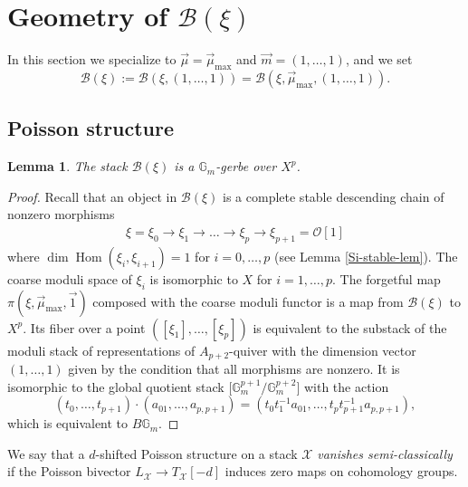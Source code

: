\documentclass[reqno]{amsart}
\newtheorem{lemma}[theorem]{Lemma}
\theoremstyle{definition}
\theoremstyle{remark}
\newcommand{\G}{{\mathbb G}}
\newcommand{\Hom}{\operatorname{Hom}}
\newcommand{\cO}{\mathcal{O}}
\newcommand{\sX}{\mathscr{X}}
\newcommand{\sB}{\mathscr{B}}
\newcommand{\am}{\overrightarrow{m}}
\newcommand{\aone}{\overrightarrow{1}}
\newcommand{\amu}{\overrightarrow{\mu}}
\numberwithin{equation}{section}
\begin{document}

\section{Geometry of $\sB(\xi)$}
\label{sec:m=1}

In this section we specialize to $\amu=\amu_{\max}$ and $\am=(1,\ldots,1)$, and we set
$$\sB(\xi):=\sB(\xi,(1,\ldots,1))=\sB(\xi,\amu_{\max},(1,\ldots,1)).$$

\subsection{Poisson structure}
\begin{lemma}\label{lem:Gm}
The stack
$\sB(\xi)$
is a $\G_m$-gerbe over $X^p$.
\end{lemma}
\begin{proof}
Recall that an object in $\sB(\xi)$ is a complete stable descending chain of nonzero morphisms
\begin{align}\label{a chain}
\xi=\xi_0\to \xi_1\to\ldots\to \xi_{p}\to \xi_{p+1}=\cO[1]
\end{align}  
where  $\dim\Hom(\xi_i,\xi_{i+1})=1$ for $i=0, \ldots, p$ (see Lemma \ref{Si-stable-lem}).
The coarse moduli space of $\xi_i$ is isomorphic to $X$ for $i=1,\ldots, p$. The forgetful map $\pi(\xi,\amu_{\max},\aone)$ composed with the coarse moduli functor is a map from 
$\sB(\xi)$ to $X^p$. Its fiber over
a point $([\xi_1],\ldots,[\xi_p])$ is equivalent to the substack of  the moduli stack of representations of $A_{p+2}$-quiver with the dimension vector $(1,\ldots,1)$ given by the condition that all morphisms are nonzero.
It is isomorphic to the global quotient stack $\Big[\G_m^{p+1}/\G_m^{p+2}\Big]$ with the action
\[
(t_0,\ldots,t_{p+1})\cdot (a_{01},\ldots,a_{p,p+1})=(t_0t_1^{-1}a_{01},\ldots,t_pt_{p+1}^{-1}a_{p,p+1}),
\]
which is equivalent to $B\G_m$.
\end{proof}

We say that a $d$-shifted Poisson structure on a stack $\sX$ \emph{vanishes semi-classically} if the Poisson bivector $L_\sX\to T_\sX[-d]$ induces zero maps on cohomology groups.  
\end{document}
